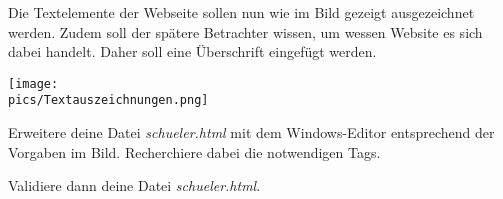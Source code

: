 \begin{Exercise}[title=Füge deiner Webseite Textauszeichnungen hinzu., label=Textauszeichnungen]

    Die Textelemente der Webseite sollen nun wie im Bild gezeigt ausgezeichnet werden. Zudem soll der spätere Betrachter wissen, um wessen Website es sich dabei handelt. Daher soll eine Überschrift eingefügt werden.
    \begin{minipage}[t]{\textwidth}
        \texttt{[image: \\pics/Textauszeichnungen.png]}
    \end{minipage}
    Erweitere deine Datei \textit{schueler.html} mit dem Windows-Editor entsprechend der Vorgaben im Bild. Recherchiere dabei die notwendigen Tags.

    Validiere dann deine Datei \textit{schueler.html}.
\end{Exercise}


